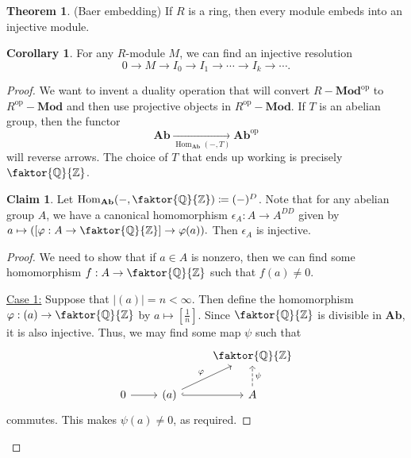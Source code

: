 \documentclass[10pt,letterpaper,cm]{nupset}
\theoremstyle{definition}
\theoremstyle{theorem}
\newtheorem{theorem}[definition]{Theorem}
\newtheorem{corollary}[definition]{Corollary}
\newtheorem*{claim}{Claim}
\theoremstyle{remark}
\newcommand{\Q}{\mathbb Q}
\newcommand{\Z}{\mathbb Z}
\newcommand{\1}{\mathbf{1}}
\newcommand{\0}{\vec 0}
\DeclareMathOperator{\op}{op}
\DeclareMathOperator{\Hom}{Hom}
\begin{document}
\begin{theorem}{(Baer embedding)}
If $R$ is a ring, then every module embeds into an injective module.
\begin{corollary}
For any $R$-module $M$, we can find an injective resolution $$ 0 \to M \to I_0 \to I_1 \to \cdots \to I_k \to \cdots  . $$
\end{corollary} 
\end{theorem}
\begin{proof}
We want to invent a duality operation that will convert $R {-} \mathbf{Mod}^{\op}$ to  $R^{\op} {-} \mathbf{Mod}$ and then use projective objects in $R^{\op}{-}\mathbf{Mod}$. If $T$ is an abelian group, then the functor $$ \mathbf{Ab}\underset{\Hom_{\mathbf{Ab}}(-, T)}{ \longrightarrow} \mathbf{Ab}^{\op}$$ will reverse arrows. The choice of $T$ that ends up working is precisely $\faktor{\Q}{\Z}$.
\begin{claim}
Let $\Hom_{\mathbf{Ab}}(-, \faktor{\Q}{\Z}) \coloneqq  (-)^D$. Note that for any abelian group $A$, we have a canonical homomorphism $\epsilon_A : A \to A^{DD}$ given by $a \mapsto ([\varphi :A \to \faktor{\Q}{\Z}] \to \varphi(a)).$ Then $\epsilon_A$ is injective.
\end{claim}
\begin{proof}
We need to show that if $a\in A$ is nonzero, then we can find some homomorphism $f: A \to \faktor{\Q}{\Z}$ such that $f(a) \ne 0$.

\underline{Case 1:} Suppose that $|(a)| = n< \infty$. Then define the homomorphism $\varphi : (a) \to \faktor{\Q}{\Z}$ by $a \mapsto [\frac{1}{n}]$. Since $\faktor{\Q}{\Z}$ is divisible in $\mathbf{Ab}$, it is also injective. Thus, we may find some map  $\psi$ such that 
\[
\begin{tikzcd}
 &  & \faktor{\Q}{\Z} \\
0 \arrow[r] & (a) \arrow[r, hook] \arrow[ru, "\varphi"] & A \arrow[u, "\psi"', dashed]
\end{tikzcd}
\] commutes. This makes $\psi(a) \ne 0$, as required.


\end{proof}
\end{proof}
\end{document}
